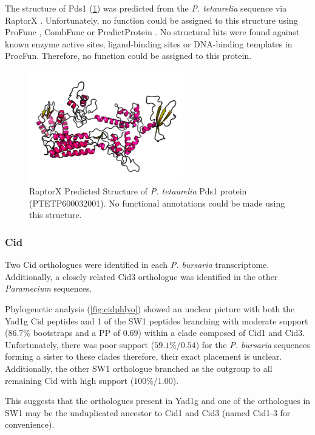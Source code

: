 The structure of Pds1 (\cref{fig:pds1_struct}) was predicted 
from the \textit{P. tetaurelia}
sequence via RaptorX \citep{Kallberg2012}.  Unfortunately,
no function could be assigned to this structure using ProFunc \citep{Laskowski2005},
CombFunc \citep{Wass2012} or PredictProtein \citep{Rost2004}.
No structural hits were found against known enzyme active sites, ligand-binding
sites or DNA-binding templates in ProcFun.
Therefore, no function could be assigned to this protein.

\begin{figure}
    \centering
    \includegraphics[width=0.6\textwidth]{psd1_struct.png}
    \caption[Predicted structure of Pds1]{RaptorX Predicted Structure of \textit{P. tetaurelia}
    Pds1 protein (PTETP600032001). No functional annotations could be made using this structure.}
    \label{fig:pds1_struct}
\end{figure}

\subsubsection{Cid}

Two Cid orthologues were identified in each \textit{P. bursaria}
transcriptome.  Additionally, a closely related Cid3 orthologue
was identified in the other \textit{Paramecium} sequences.

Phylogenetic analysis (\cref{fig:cidphlyo}) showed an unclear
picture with both the Yad1g Cid peptides and 1 of the SW1 peptides
branching with moderate support (\(86.7\%\) bootstraps and
a PP of \(0.69\)) within a 
clade composed of Cid1 and Cid3.  Unfortunately, there was
poor support (\(59.1\%\)/\(0.54\)) for the \textit{P. bursaria}
sequences forming a sister to these clades therefore,
their exact placement is unclear.
Additionally, the other
SW1 orthologue branched as the outgroup to all remaining Cid
with high support (\(100\%\)/\(1.00\)). 

This suggests that the orthologues present in Yad1g and one of
the orthologues in SW1 may be the unduplicated ancestor
to Cid1 and Cid3 (named Cid1-3 for convenience).


